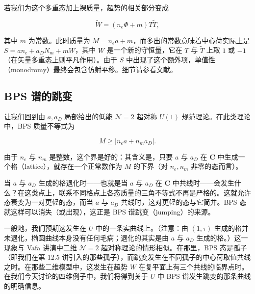 若我们为这个多重态加上裸质量，超势的相关部分变成

\[
  \tilde W=(n_e\Phi+m)T\tilde T,
\]

其中 $m$ 为常数。此时质量为 $M=n_ea+m$，而多出的常数意味着中心荷实际上是 $S=an_e+a_DN_m+mW$，其中 $W$ 是一个新的守恒量，它在 $T$ 与 $\tilde T$ 上取 $1$ 或 $-1$（在矢量多重态上则平凡作用）。由于 $S$ 中出现了这个额外项，单值性（monodromy）最终会包含仿射平移。细节请参看文献。


\subsection{BPS 谱的跳变}

让我们回到由 $a,a_D$ 局部给出的低能 $\mathcal{N}=2$ 超对称 $U(1)$ 规范理论。在此类理论中，BPS 质量不等式为

\[
  M\ge|n_ea+n_ma_D| .
\]

由于 $n_e$ 与 $n_m$ 是整数，这个界是好的：其含义是，只要 $a$ 与 $a_D$ 在 $\mathbf{C}$ 中生成一个格（lattice），就存在一个正常数作为 $M$ 的下界（对 $n_e,n_m$ 非零的态而言）。

当 $a$ 与 $a_D$ 生成的格退化时——也就是当 $a$ 与 $a_D$ 在 $\mathbf{C}$ 中共线时——会发生什么？在这类点上，联系不同格点上各态质量的三角不等式不再是严格的。这就允许态衰变为一对更轻的态，而当 $a$ 与 $a_D$ 共线时，这对更轻的态与它简并。BPS 态就这样可以消失（或出现），这正是 BPS 谱跳变（jumping）的来源。

一般地，我们预期这发生在 $U$ 中的一条实曲线上。（注意：由 $(1,\tau)$ 生成的格并未退化，椭圆曲线本身没有任何毛病；退化的其实是由 $a$ 与 $a_D$ 生成的格。）这一现象与 Vafa 讲演中二维 $\mathcal{N}=2$ 超对称理论的情形相似。在那里，BPS 态是孤子（即我们在第 12.5 讲引入的那些孤子），而跳变发生在不同孤子的中心荷取值共线之时。在那些二维模型中，这发生在超势 $W$ 在复平面上有三个共线的临界点时。在我们今天讨论的四维例子中，我们将得到关于 $U$ 中 BPS 谱发生跳变的那条曲线的明确信息。


